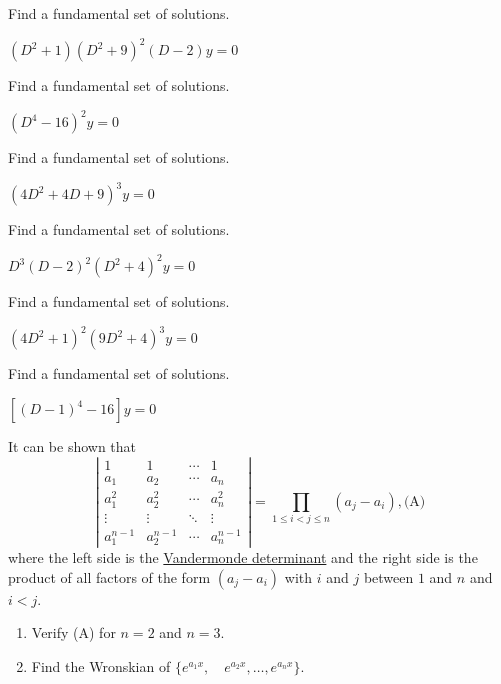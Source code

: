 \documentclass{ximera}
\begin{document}
\begin{problem}\label{exer:9.2.33}  Find a
fundamental set of solutions.

$(D^2+1)(D^2+9)^2(D-2)y=0$
\end{problem}

\begin{problem}\label{exer:9.2.34} Find a
fundamental set of solutions.

$(D^4-16)^2y=0$
\end{problem}

\begin{problem}\label{exer:9.2.35}  Find a
fundamental set of solutions.

$(4D^2+4D+9)^3y=0$
\end{problem}

\begin{problem}\label{exer:9.2.36} Find a
fundamental set of solutions.

$D^3(D-2)^2(D^2+4)^2y=0$
\end{problem}

\begin{problem}\label{exer:9.2.37}  Find a
fundamental set of solutions.

$(4D^2+1)^2(9D^2+4)^3y=0$
\end{problem}

\begin{problem}\label{exer:9.2.38} Find a
fundamental set of solutions.

$\left[(D-1)^4-16\right]y=0$
\end{problem}


\begin{problem}\label{exer:9.2.39}
It can be shown that
$$
\left|\begin{array}{cccc}
1&1&\cdots&1\\
a_1&a_2&\cdots&a_n\\
a^2_1&a^2_2&\cdots&a^2_n\\
\vdots&\vdots&\ddots&\vdots\\
a^{n-1}_1&a^{n-1}_2&\cdots&a^{n-1}_n\end{array}\right|=
\prod_{1\le i<j\le n}(a_j-a_i),
\text{(A)}
$$
where the left side is  the
\href{http://www-history.mcs.st-and.ac.uk/Mathematicians/Vandermonde.html}{Vandermonde
  determinant} and
the right side is the product of all factors of the form $(a_j-a_i)$
with $i$ and $j$ between $1$ and $n$ and $i<j$.

\begin{enumerate}
\item %
Verify  (A) for $n=2$ and $n=3$.

\item %
Find the Wronskian of $\{e^{{a_1}x}, \quad  e^{{a_2}x},\dots, e^{{a_n}x}\}$.
\end{enumerate}
\end{problem}
\end{document}
